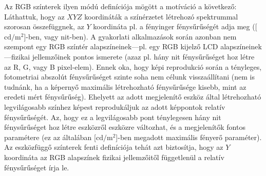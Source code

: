\vspace{3mm}
Az RGB színterek ilyen módú definíciója mögött a motíváció a következő:
Láthattuk, hogy az $XYZ$ koordináták a színérzetet létrehozó spektrummal szorosan összefüggnek, az $Y$ koordináta pl. a fényinger fénysűrűségét adja meg ([$\mathrm{cd}/\mathrm{m}^2$]-ben, vagy nit-ben).
A gyakorlati alkalmazások során azonban nem szempont egy RGB színtér alapszíneinek---pl. egy RGB kijelző LCD alapszíneinek---fizikai jellemzőinek pontos ismerete (azaz pl. hány nit fénysűrűséget hoz létre az R, G, vagy B pixel-elem).
Ennek oka, hogy képi reprodukció során a tényleges, fotometriai abszolút fénysűrűséget szinte soha nem célunk visszaállítani (nem is tudnánk, ha a képernyő maximális létrehozható fénysűrűsége kisebb, mint az eredeti mért fénysűrűség).
Ehelyett az adott megjelenítő eszköz által létrehozható legvilágosabb színhez képest reprodukáljuk az adott képpontok relatív fénysűrűségét.
Az, hogy ez a legvilágosabb pont ténylegesen hány nit fénysűrűséget hoz létre eszközről eszközre változhat, és a megjelenítők fontos paramétere (ez az általában [$\mathrm{cd}/\mathrm{m}^2$]-ben megadott maximális fényerő paraméter).
Az eszközfüggő színterek fenti definíciója tehát azt biztosítja, hogy az $Y$ koordináta az RGB alapszínek fizikai jellemzőitől függetlenül a relatív fénysűrűséget írja le.

